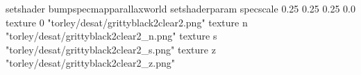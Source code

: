 setshader bumpspecmapparallaxworld
setshaderparam specscale 0.25 0.25 0.25 0.0
texture 0 "torley/desat/grittyblack2clear2.png"
texture n "torley/desat/grittyblack2clear2_n.png"
texture s "torley/desat/grittyblack2clear2_s.png"
texture z "torley/desat/grittyblack2clear2_z.png"

